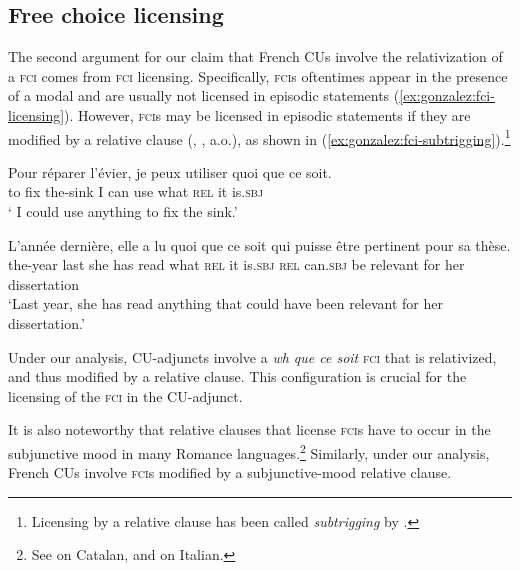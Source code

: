 \documentclass[output=paper]{langscibook}
\begin{document}
\z

\subsection{Free choice licensing}\label{sec:gonzalez:fcilicensing}

The second argument for our claim that French CUs involve the relativization of a \textsc{fci} comes from \textsc{fci} licensing. Specifically, \textsc{fci}s oftentimes appear in the presence of a modal and are usually not licensed in episodic statements (\ref{ex:gonzalez:fci-licensing}). However, \textsc{fci}s may be licensed in episodic statements if they are modified by a relative clause (\citealt{legrand1975}, \citealt{dayal1998}, a.o.), as shown in (\ref{ex:gonzalez:fci-subtrigging}).\footnote{Licensing by a relative clause has been called \textit{subtrigging} by \cite{legrand1975}.}

\ea \label{ex:gonzalez:fci-licensing}
\ea \gll Pour r\'eparer l'\'evier, je peux utiliser quoi que ce soit.\\
 to fix the-sink I can use what \textsc{rel} it is.\textsc{sbj}\\ 
\glt ` I could use anything to fix the sink.'
\z 

\z

\ea \label{ex:gonzalez:fci-subtrigging}
\gll L'ann\'ee derni\`ere, elle a lu quoi que ce soit qui puisse \^etre pertinent pour sa th\`ese.\\
the-year last she has read what \textsc{rel} it is.\textsc{sbj} \textsc{rel} can.\textsc{sbj} be relevant for her dissertation\\ 
\glt `Last year, she has read anything that could have been relevant for her dissertation.'
\z 

 Under our analysis, CU-adjuncts involve a \emph{wh que ce soit} \textsc{fci} that is relativized, and thus modified by a relative clause. This configuration is crucial for the licensing of the \textsc{fci} in the CU-adjunct. 

It is also noteworthy that relative clauses that license \textsc{fci}s have to occur in the subjunctive mood in many Romance languages.\footnote{See \citet{quer1998,quer2000}  on Catalan, and \citet{chierchia2013} on Italian.} Similarly, under our analysis, French CUs involve \textsc{fci}s modified by a subjunctive-mood relative clause.
\end{document}
